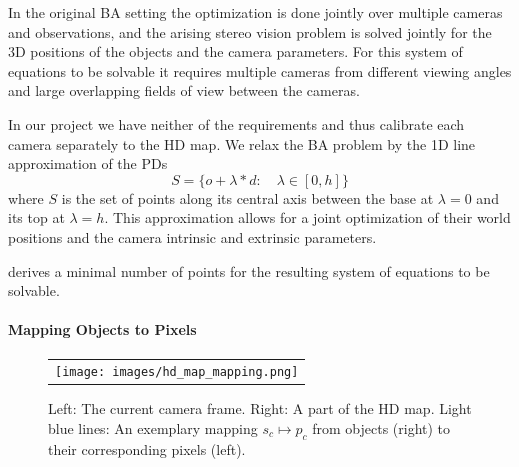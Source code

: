 In the original BA setting the optimization is done jointly over multiple cameras and observations, and the arising stereo vision problem is solved jointly for the 3D positions of the objects and the camera parameters.
For this system of equations to be solvable it requires multiple cameras from different viewing angles and large overlapping fields of view between the cameras.

In our project we have neither of the requirements and thus calibrate each camera separately to the HD map.
We relax the BA problem by the 1D line approximation of the PDs
\begin{equation}
S = \{o + \lambda * d: \quad \lambda \in [0, h]\}
\end{equation}
where $S$ is the set of points along its central axis between the base at $\lambda = 0$ and its top at $\lambda = h$.
This approximation allows for a joint optimization of their world positions and the camera intrinsic and extrinsic parameters.

 derives a minimal number of points for the resulting system of equations to be solvable.




\paragraph{Mapping Objects to Pixels}
\begin{figure}[t]
  \centering
  \begin{tabular}{c}
     \texttt{[image: images/hd\_map\_mapping.png]}
    \end{tabular}
    \caption{
       Left: The current camera frame. 
       Right: A part of the HD map.
       Light blue lines: An exemplary mapping $s_c \mapsto p_c$ from objects (right) to their corresponding pixels (left).
       }
  \label{fig:static_calibration_mapping}
  \end{figure}

